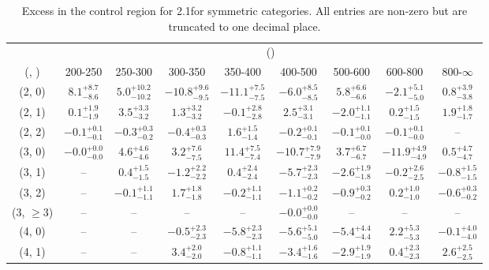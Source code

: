 \begin{table}[h!]
\tiny
\centering
\caption{Excess in the \mmj control region for 2.1\ifb for symmetric categories. All entries are non-zero but are truncated to one decimal place.\label{tab:excesssepnaive_mumu_ewk_sym}}
\begin{tabular}
{ccccccccc}
	\hline\hline
	& \multicolumn{8}{c}{\scalht (\gev)} \\ 
	 (\njet,  \nb) & 200-250 & 250-300 & 300-350 & 350-400 & 400-500 & 500-600 & 600-800 & 800-$\infty$ \\ [0.8ex] 
\hline
	(2, 0) & $8.1^{+ 8.7 }_{- 8.6 }$ & $5.0^{+ 10.2 }_{- 10.2 }$ & $-10.8^{+ 9.6 }_{- 9.5 }$ & $-11.1^{+ 7.5 }_{- 7.5 }$ & $-6.0^{+ 8.5 }_{- 8.5 }$ & $5.8^{+ 6.6 }_{- 6.6 }$ & $-2.1^{+ 5.1 }_{- 5.0 }$ & $0.8^{+ 3.9 }_{- 3.8 }$ \\[0.5ex] 
	(2, 1) & $0.1^{+ 1.9 }_{- 1.9 }$ & $3.5^{+ 3.3 }_{- 3.2 }$ & $1.3^{+ 3.2 }_{- 3.2 }$ & $-0.1^{+ 2.8 }_{- 2.8 }$ & $2.5^{+ 3.1 }_{- 3.1 }$ & $-2.0^{+ 1.1 }_{- 1.1 }$ & $0.2^{+ 1.5 }_{- 1.5 }$ & $1.9^{+ 1.8 }_{- 1.7 }$ \\[0.5ex] 
	(2, 2) & $-0.1^{+ 0.1 }_{- 0.1 }$ & $-0.3^{+ 0.3 }_{- 0.2 }$ & $-0.4^{+ 0.3 }_{- 0.3 }$ & $1.6^{+ 1.5 }_{- 1.4 }$ & $-0.2^{+ 0.1 }_{- 0.1 }$ & $-0.1^{+ 0.1 }_{- 0.0 }$ & $-0.1^{+ 0.1 }_{- 0.0 }$ & -- \\[0.5ex] 
	(3, 0) & $-0.0^{+ 0.0 }_{- 0.0 }$ & $4.6^{+ 4.6 }_{- 4.6 }$ & $3.2^{+ 7.6 }_{- 7.5 }$ & $11.4^{+ 7.5 }_{- 7.4 }$ & $-10.7^{+ 7.9 }_{- 7.9 }$ & $3.7^{+ 6.7 }_{- 6.7 }$ & $-11.9^{+ 4.9 }_{- 4.9 }$ & $0.5^{+ 4.7 }_{- 4.7 }$ \\[0.5ex] 
	(3, 1) & -- & $0.4^{+ 1.5 }_{- 1.5 }$ & $-1.2^{+ 2.2 }_{- 2.2 }$ & $0.4^{+ 2.4 }_{- 2.4 }$ & $-5.7^{+ 2.3 }_{- 2.3 }$ & $-2.6^{+ 1.9 }_{- 1.8 }$ & $-0.2^{+ 2.6 }_{- 2.5 }$ & $-0.8^{+ 1.5 }_{- 1.5 }$ \\[0.5ex] 
	(3, 2) & -- & $-0.1^{+ 1.1 }_{- 1.1 }$ & $1.7^{+ 1.8 }_{- 1.8 }$ & $-0.2^{+ 1.1 }_{- 1.1 }$ & $-1.1^{+ 0.2 }_{- 0.2 }$ & $-0.9^{+ 0.3 }_{- 0.2 }$ & $0.2^{+ 1.0 }_{- 1.0 }$ & $-0.6^{+ 0.3 }_{- 0.2 }$ \\[0.5ex] 
	(3, $\ge3$) & -- & -- & -- & -- & $-0.0^{+ 0.0 }_{- 0.0 }$ & -- & -- & -- \\[0.5ex] 
	(4, 0) & -- & -- & $-0.5^{+ 2.3 }_{- 2.3 }$ & $-5.8^{+ 2.3 }_{- 2.3 }$ & $-5.6^{+ 5.1 }_{- 5.0 }$ & $-5.4^{+ 4.4 }_{- 4.4 }$ & $2.2^{+ 5.3 }_{- 5.3 }$ & $-0.1^{+ 4.0 }_{- 4.0 }$ \\[0.5ex] 
	(4, 1) & -- & -- & $3.4^{+ 2.0 }_{- 2.0 }$ & $-0.8^{+ 1.1 }_{- 1.1 }$ & $-3.4^{+ 1.6 }_{- 1.6 }$ & $-2.9^{+ 1.9 }_{- 1.9 }$ & $0.4^{+ 2.3 }_{- 2.3 }$ & $2.6^{+ 2.5 }_{- 2.5 }$ \\[0.5ex] 

\end{tabular}
\end{table}
